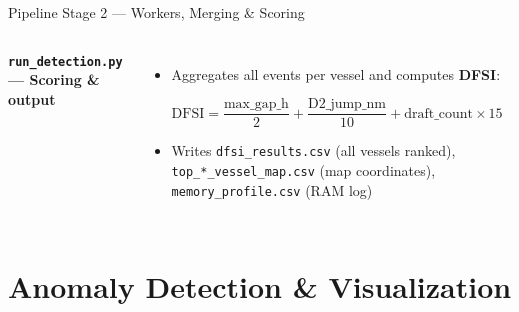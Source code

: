\documentclass[svgnames, 9pt]{beamer}
\begin{document}
\begin{frame}{Pipeline Stage 2 — Workers, Merging \& Scoring}
\begin{columns}[T]
        \vspace{0.3em}
        {\scriptsize\color{maincolor}\textbf{\texttt{run\_detection.py} — Scoring \& output}}
        \vspace{0.1em}
        \begin{itemize}\scriptsize
            \item Aggregates all events per vessel and computes \textbf{DFSI}:
            \vspace{0.1em}

            {\scriptsize
            $\text{DFSI} = \dfrac{\text{max\_gap\_h}}{2}
                         + \dfrac{\text{D2\_jump\_nm}}{10}
                         + \text{draft\_count} \times 15$}

            \vspace{0.15em}
            \item Writes \texttt{dfsi\_results.csv} (all vessels ranked),
                  \texttt{top\_*\_vessel\_map.csv} (map coordinates),
                  \texttt{memory\_profile.csv} (RAM log)
        \end{itemize}

    \end{columns}
\end{frame}

\section{Anomaly Detection \& Visualization}
\end{document}
